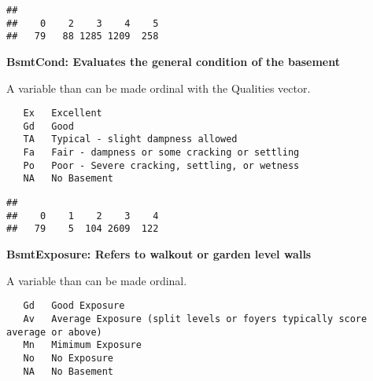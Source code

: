 \documentclass[]{article}
\newenvironment{Shaded}{\begin{snugshade}}{\end{snugshade}}
\newcommand{\DecValTok}[1]{\textcolor[rgb]{0.00,0.00,0.81}{#1}}
\newcommand{\KeywordTok}[1]{\textcolor[rgb]{0.13,0.29,0.53}{\textbf{#1}}}
\newcommand{\NormalTok}[1]{#1}
\newcommand{\OperatorTok}[1]{\textcolor[rgb]{0.81,0.36,0.00}{\textbf{#1}}}
\newcommand{\StringTok}[1]{\textcolor[rgb]{0.31,0.60,0.02}{#1}}
\begin{document}
\begin{verbatim}
## 
##    0    2    3    4    5 
##   79   88 1285 1209  258
\end{verbatim}

\textbf{BsmtCond: Evaluates the general condition of the basement}

A variable than can be made ordinal with the Qualities vector.

\begin{verbatim}
   Ex   Excellent
   Gd   Good
   TA   Typical - slight dampness allowed
   Fa   Fair - dampness or some cracking or settling
   Po   Poor - Severe cracking, settling, or wetness
   NA   No Basement
\end{verbatim}

\begin{Shaded}
\end{Shaded}

\begin{verbatim}
## 
##    0    1    2    3    4 
##   79    5  104 2609  122
\end{verbatim}

\textbf{BsmtExposure: Refers to walkout or garden level walls}

A variable than can be made ordinal.

\begin{verbatim}
   Gd   Good Exposure
   Av   Average Exposure (split levels or foyers typically score average or above)  
   Mn   Mimimum Exposure
   No   No Exposure
   NA   No Basement
\end{verbatim}

\begin{Shaded}
\end{Shaded}
\end{document}
